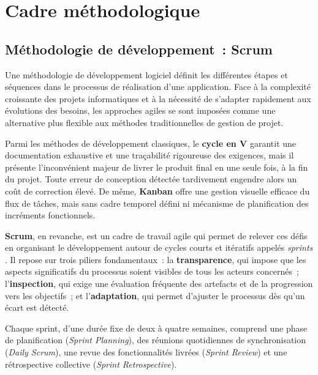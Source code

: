 \section{Cadre m\'{e}thodologique}
\label{sec:cadre}

\subsection{M\'{e}thodologie de d\'{e}veloppement~: Scrum}

Une m\'{e}thodologie de d\'{e}veloppement logiciel d\'{e}finit les diff\'{e}rentes \'{e}tapes et s\'{e}quences dans le processus de r\'{e}alisation d'une application. Face \`{a} la complexit\'{e} croissante des projets informatiques et \`{a} la n\'{e}cessit\'{e} de s'adapter rapidement aux \'{e}volutions des besoins, les approches agiles se sont impos\'{e}es comme une alternative plus flexible aux m\'{e}thodes traditionnelles de gestion de projet.

\indent Parmi les m\'{e}thodes de d\'{e}veloppement classiques, le \textbf{cycle en V} garantit une documentation exhaustive et une tra\c{c}abilit\'{e} rigoureuse des exigences, mais il pr\'{e}sente l'inconv\'{e}nient majeur de livrer le produit final en une seule fois, \`{a} la fin du projet. Toute erreur de conception d\'{e}tect\'{e}e tardivement engendre alors un co\^{u}t de correction \'{e}lev\'{e}. De m\^{e}me, \textbf{Kanban} offre une gestion visuelle efficace du flux de t\^{a}ches, mais sans cadre temporel d\'{e}fini ni m\'{e}canisme de planification des incr\'{e}ments fonctionnels.

\indent \textbf{Scrum}, en revanche, est un cadre de travail agile qui permet de relever ces d\'{e}fis en organisant le d\'{e}veloppement autour de cycles courts et it\'{e}ratifs appel\'{e}s \textit{sprints} \cite{scrum}. Il repose sur trois piliers fondamentaux~: la \textbf{transparence}, qui impose que les aspects significatifs du processus soient visibles de tous les acteurs concern\'{e}s~; l'\textbf{inspection}, qui exige une \'{e}valuation fr\'{e}quente des artefacts et de la progression vers les objectifs~; et l'\textbf{adaptation}, qui permet d'ajuster le processus d\`{e}s qu'un \'{e}cart est d\'{e}tect\'{e}.

\indent Chaque sprint, d'une dur\'{e}e fixe de deux \`{a} quatre semaines, comprend une phase de planification (\textit{Sprint Planning}), des r\'{e}unions quotidiennes de synchronisation (\textit{Daily Scrum}), une revue des fonctionnalit\'{e}s livr\'{e}es (\textit{Sprint Review}) et une r\'{e}trospective collective (\textit{Sprint Retrospective}).

